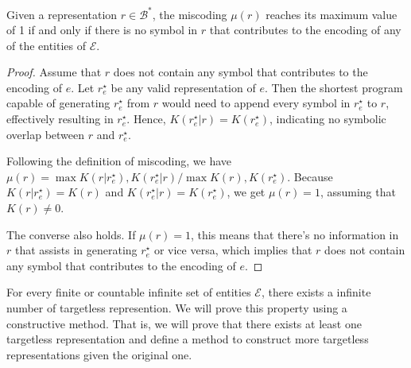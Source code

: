 \begin{proposition}
\label{prop:miscoding_upper_bound}
Given a representation $r \in \mathcal{B}^\ast$, the miscoding $\mu(r)$ reaches its maximum value of 1 if and only if there is no symbol in $r$ that contributes to the encoding of any of the entities of $\mathcal{E}$.
\end{proposition}
\begin{proof}
Assume that $r$ does not contain any symbol that contributes to the encoding of $e$. Let $r^\star_e$ be any valid representation of $e$. Then the shortest program capable of generating $r^\star_e$ from $r$ would need to append every symbol in $r^\star_e$ to $r$, effectively resulting in $r^\star_e$. Hence, $K(r^\star_e | r) = K(r^\star_e)$, indicating no symbolic overlap between $r$ and $r^\star_e$.

Following the definition of miscoding, we have $\mu(r) = \max{ K(r | r^\star_e), K(r^\star_e | r) } / \max{K(r), K(r^\star_e)}$. Because $K(r | r^\star_e) = K(r)$ and $K(r^\star_e | r) = K(r^\star_e)$, we get $\mu(r) = 1$, assuming that $K(r) \neq 0$.

The converse also holds. If $\mu(r) = 1$, this means that there's no information in $r$ that assists in generating $r^\star_e$ or vice versa, which implies that $r$ does not contain any symbol that contributes to the encoding of $e$.
\end{proof}

For every finite or countable infinite set of entities $\mathcal{E}$, there exists a infinite number of targetless represention. We will prove this property using a constructive method. That is, we will prove that there exists at least one targetless representation and define a method to construct more targetless representations given the original one.

